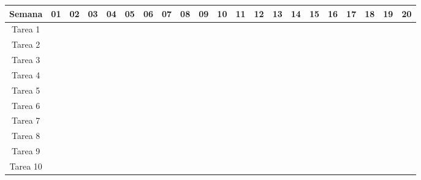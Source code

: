 \begin{landscape}
\vspace*{\fill}
\begin{center}
\begin{footnotesize}
\begingroup
\setlength{\tabcolsep}{8pt} %
\renewcommand{\arraystretch}{1.3} %
\begin{tabular}{|c|c|c|c|c|c|c|c|c|c|c|c|c|c|c|c|c|c|c|c|c|}
\hline
\textbf{Semana} & \textbf{01} & \textbf{02} & \textbf{03} & \textbf{04} & \textbf{05} & \textbf{06} & \textbf{07} & \textbf{08} & \textbf{09} & \textbf{10} & \textbf{11} & \textbf{12} & \textbf{13} & \textbf{14} & \textbf{15} & \textbf{16} & \textbf{17} & \textbf{18} & \textbf{19} & \textbf{20}\\ \hline
Tarea 1 & \cellcolor{gray}	& \cellcolor{gray}	& \cellcolor{gray}	& \cellcolor{gray}	& \cellcolor{gray}	& \cellcolor{gray}	& \cellcolor{gray}	& \cellcolor{gray}	& \cellcolor{gray}	& \cellcolor{gray}	& \cellcolor{gray}	& \cellcolor{gray}	& 	& 	& 	& 	&	&	&	& 							  	  \\ \hline
Tarea 2 & \cellcolor{gray}	& 	& 	& 	&	&	&	&	&	&	&	&	&	&	&	&	&	&	&	& 	  \\ \hline
Tarea 3 &	& \cellcolor{gray}	& \cellcolor{gray}	& \cellcolor{gray}	& 	&	&	&	&	&	&	&	&	&	&	&	&	&	&	& \\ \hline
Tarea 4 &	&	&	& 	& \cellcolor{gray}	& \cellcolor{gray} 	&	&	&	&	&	&	&	&	&	&	&	&	&	& \\ \hline
Tarea 5 &	&	&	& 	& \cellcolor{gray}	& \cellcolor{gray}	& \cellcolor{gray}	&	&	&	&	&	&	&	&	&	&	&	&	& \\ \hline
Tarea 6 &	&	&	&	&	&	&	& \cellcolor{gray}	& \cellcolor{gray}	&	&	&	&	&	&	&	&	&	&	& \\ \hline
Tarea 7 &	&	&	&	&	& 	& 	& \cellcolor{gray}	& \cellcolor{gray}	& \cellcolor{gray}	&	&	&	&	&	&	&	&	&	& \\ \hline
Tarea 8 &	&	&	&	&	&	&	& 	& 	& 	& \cellcolor{gray}	&	\cellcolor{gray} &	&	&	&	&	&	&	& \\ \hline
Tarea 9 & 	&	&	&	&	&	&	&	&	&	& 	&  	& \cellcolor{gray}	& \cellcolor{gray}	& \cellcolor{gray}	&	&	&	&	& \\ \hline
Tarea 10 & 	&	&	&	&	&	&	&	&	&	&	& 	& \cellcolor{gray}	& \cellcolor{gray}	& \cellcolor{gray}	& \cellcolor{gray}	& \cellcolor{gray}	& \cellcolor{gray}	& \cellcolor{gray}	& \cellcolor{gray} \\ \hline
\end{tabular}
\endgroup
\end{footnotesize}
\end{center}
\vspace*{\fill}
\end{landscape}

\singlespacing

